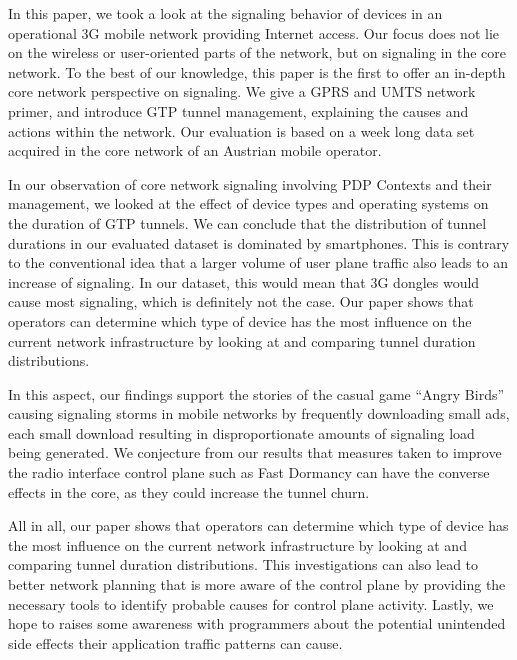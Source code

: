 In this paper, we took a look at the signaling behavior of devices in an operational \gls{3G} mobile network providing Internet access. Our focus does not lie on the wireless or user-oriented parts of the network, but on signaling in the core network. To the best of our knowledge, this paper is the first to offer an in-depth core network perspective on signaling. We give a \gls{GPRS} and \gls{UMTS} network primer, and introduce \gls{GTP} tunnel management, explaining the causes and actions within the network. Our evaluation is based on a week long data set acquired in the core network of an Austrian mobile operator.



In our observation of core network signaling involving \gls{PDP} Contexts and their management, we looked at the effect of device types and operating systems on the duration of \gls{GTP} tunnels. We can conclude that the distribution of tunnel durations in our evaluated dataset is dominated by smartphones. This is contrary to the conventional idea that a larger volume of user plane traffic also leads to an increase of signaling. In our dataset, this would mean that 3G dongles would cause most signaling, which is definitely not the case. Our paper shows that operators can determine which type of device has the most influence on the current network infrastructure by looking at and comparing tunnel duration distributions.

In this aspect, our findings support the stories of the casual game ``Angry Birds'' causing signaling storms in mobile networks by frequently downloading small ads, each small download resulting in disproportionate amounts of signaling load being generated. We conjecture from our results that measures taken to improve the radio interface control plane such as Fast Dormancy can have the converse effects in the core, as they could increase the tunnel churn.


All in all, our paper shows that operators can determine which type of device has the most influence on the current network infrastructure by looking at and comparing tunnel duration distributions. %
This investigations can also lead to better network planning that is more aware of the control plane by providing the necessary tools to identify probable causes for control plane activity. Lastly, we hope to raises some awareness with programmers about the potential unintended side effects their application traffic patterns can cause.

